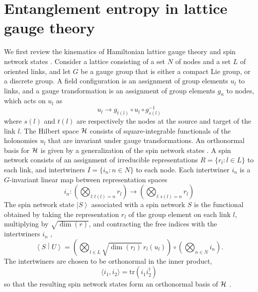 \documentclass[aps,prd,twocolumn,showpacs,groupedaddress,nofootinbib,letterpaper]{revtex4}
\newcommand{\ket}[1]{\left\vert#1\right\rangle}
\newcommand{\braket}[2]{\left\langle#1\middle|#2\right\rangle}
\begin{document}
\section{Entanglement entropy in lattice gauge theory} \label{section:main}

We first review the kinematics of Hamiltonian lattice gauge theory \cite{Kogut1975} and spin network states \cite{Baez1994}.
Consider a lattice consisting of a set $N$ of nodes and a set $L$ of oriented links, and let $G$ be a gauge group that is either a compact Lie group, or a discrete group.
A field configuration is an assignment of group elements $u_l$ to links, and a gauge transformation is an assignment of group elements $g_n$ to nodes, which acts on $u_l$ as
\begin{equation}
u_l \to g_{t(l)}^{\phantom{-1}} \circ u_l \circ g_{s(l)}^{-1}
\end{equation}
where $s(l)$ and $t(l)$ are respectively the nodes at the source and target of the link $l$.
The Hilbert space $\cal H$ consists of square-integrable functionals of the holonomies $u_l$ that are invariant under gauge transformations.
An orthonormal basis for $\cal H$ is given by a generalization of the spin network states \cite{Penrose1971, Rovelli1995, Baez1994}.
A spin network consists of an assignment of irreducible representations $R = \{ r_l : l \in L\}$ to each link, and intertwiners $I = \{i_n : n \in N\}$ to each node.
Each intertwiner $i_n$ is a $G$-invariant linear map between representation spaces
\begin{equation}
i_n : \left( \bigotimes_{l : t(l) = n} r_l \right) \to \left( \bigotimes_{l : s(l) = n} r_l  \right)
\end{equation}
The spin network state $\ket{S}$ associated with a spin network $S$ is the functional obtained by taking the representation $r_l$ of the group element on each link $l$, multiplying by $\sqrt{\dim(r)}$, and contracting the free indices with the intertwiners $i_n$ \cite{Baez1994},
\begin{equation} \label{wavefunction}
\braket{S}{U} = \left( \bigotimes_{l \in L} \sqrt{\dim(r_l)} \, r_l(u_l) \right) \circ \left( \bigotimes_{n \in N} i_n \right).
\end{equation}
The intertwiners are chosen to be orthonormal in the inner product,
\begin{equation}
\langle i_1, i_2 \rangle = \text{tr}(i_1 i_2^\dag)
\end{equation}
so that the resulting spin network states form an orthonormal basis of $\cal H$ \cite{DePietri1996}.
\end{document}
